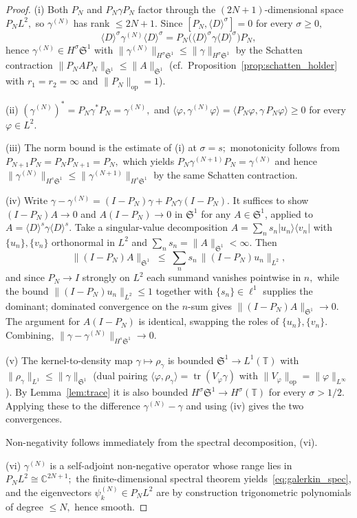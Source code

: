 \documentclass[11pt]{amsart}
\theoremstyle{definition}
\newcommand{\T}{\mathbb{T}}
\newcommand{\C}{\mathbb{C}}
\newcommand{\Sp}{\mathfrak{S}}
\DeclareMathOperator{\tr}{tr}
\begin{document}
\begin{proof}
(i) Both $P_N$ and $P_N\gamma P_N$ factor through the $(2N+1)$-dimensional space $P_NL^2,$ so $\gamma^{(N)}$ has rank $\le 2N+1.$ Since $[P_N,\langle D\rangle^\sigma]=0$ for every $\sigma\ge 0,$
\[
  \langle D\rangle^\sigma\gamma^{(N)}\langle D\rangle^\sigma
  =P_N\bigl(\langle D\rangle^\sigma\gamma
  \langle D\rangle^\sigma\bigr)P_N,
\]
hence $\gamma^{(N)}\in H^\sigma\Sp^1$ with $\|\gamma^{(N)}\|_{H^\sigma\Sp^1}\le\|\gamma\|_{H^\sigma\Sp^1}$ by the Schatten contraction $\|P_NAP_N\|_{\Sp^1}\le\|A\|_{\Sp^1}$ (cf.\ Proposition~\ref{prop:schatten_holder} with $r_1=r_2=\infty$ and $\|P_N\|_{\mathrm{op}}=1$).

(ii) $(\gamma^{(N)})^{*}=P_N\gamma^{*}P_N=\gamma^{(N)},$ and $\langle\varphi,\gamma^{(N)}\varphi\rangle=\langle P_N\varphi,\gamma\,P_N\varphi\rangle\ge 0$ for every $\varphi\in L^2.$

(iii) The norm bound is the estimate of (i) at $\sigma=s;$ monotonicity follows from $P_{N+1}P_N=P_NP_{N+1}=P_N,$ which yields $P_N\gamma^{(N+1)}P_N=\gamma^{(N)}$ and hence $\|\gamma^{(N)}\|_{H^s\Sp^1}\le\|\gamma^{(N+1)}\|_{H^s\Sp^1}$ by the same Schatten contraction.

(iv) Write $\gamma-\gamma^{(N)}=(I-P_N)\gamma+P_N\gamma(I-P_N).$ It suffices to show $(I-P_N)A\to 0$ and $A(I-P_N)\to 0$ in $\Sp^1$ for any $A\in\Sp^1$, applied to $A=\langle D\rangle^s\gamma\langle D\rangle^s.$ Take a singular-value decomposition $A=\sum_n s_n|u_n\rangle\langle v_n|$ with $\{u_n\},\{v_n\}$ orthonormal in $L^2$ and $\sum_n s_n=\|A\|_{\Sp^1}<\infty.$ Then
\[
  \|(I-P_N)A\|_{\Sp^1}
  \;\le\; \sum_n s_n\,\|(I-P_N)u_n\|_{L^2},
\]
and since $P_N\to I$ strongly on $L^2$ each summand vanishes pointwise in $n,$ while the bound $\|(I-P_N)u_n\|_{L^2}\le 1$ together with $\{s_n\}\in\ell^1$ supplies the dominant; dominated convergence on the $n$-sum gives $\|(I-P_N)A\|_{\Sp^1}\to 0.$ The argument for $A(I-P_N)$ is identical, swapping the roles of $\{u_n\},\{v_n\}.$ Combining, $\|\gamma-\gamma^{(N)}\|_{H^s\Sp^1}\to 0.$

(v) The kernel-to-density map $\gamma\mapsto\rho_\gamma$ is bounded $\Sp^1\to L^1(\T)$ with $\|\rho_\gamma\|_{L^1}\le\|\gamma\|_{\Sp^1}$ (dual pairing $\langle\varphi,\rho_\gamma\rangle=\tr(V_\varphi\gamma)$ with $\|V_\varphi\|_{\mathrm{op}}=\|\varphi\|_{L^\infty}$). By Lemma~\ref{lem:trace} it is also bounded $H^\sigma\Sp^1\to H^\sigma(\T)$ for every $\sigma>1/2.$ Applying these to the difference $\gamma^{(N)}-\gamma$ and using (iv) gives the two convergences.

Non-negativity follows immediately from the spectral decomposition, (vi).

(vi) $\gamma^{(N)}$ is a self-adjoint non-negative operator whose range lies in $P_NL^2\cong\C^{2N+1};$ the finite-dimensional spectral theorem yields~\eqref{eq:galerkin_spec}, and the eigenvectors $\psi_k^{(N)}\in P_NL^2$ are by construction trigonometric polynomials of degree $\le N,$ hence smooth.
\end{proof}
\end{document}
